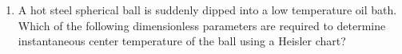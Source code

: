 \documentclass[journal,12pt,onecolumn]{IEEEtran}
\theoremstyle{remark}
\begin{document}
\begin{enumerate}
    \item A hot steel spherical ball is suddenly dipped into a low temperature oil bath. Which of 
        the following dimensionless parameters are required to determine instantaneous center temperature
        of the ball using a Heisler chart?
        \hfill{}
            \begin{enumerate}
            \end{enumerate}
    
\end{enumerate}
\end{document}
